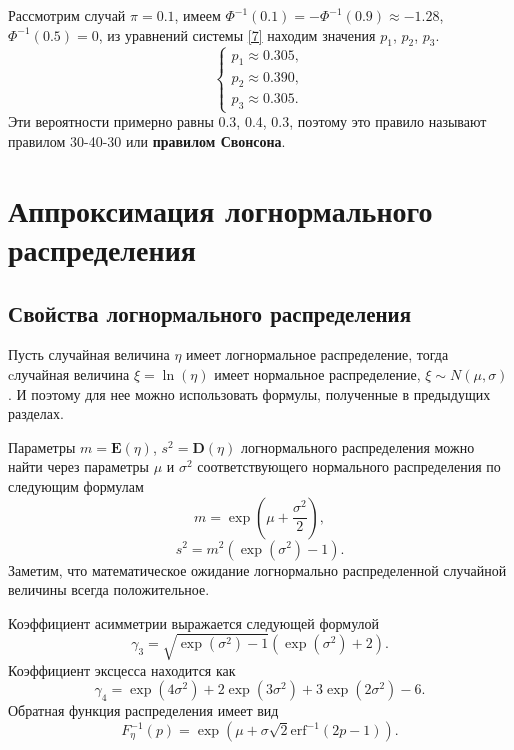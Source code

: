 \documentclass[12pt]{article}
\begin{document}
	Рассмотрим случай $\pi = 0.1$, имеем $\Phi ^{-1}(0.1) = -\Phi ^{-1}(0.9) \approx  -1.28$, $\Phi ^{-1}(0.5) = 0$, из уравнений системы \eqref{7} находим значения $p_{1}$, $p_{2}$, $p_{3}$.
	\begin{equation*}
		\begin{cases}
			p_{1}\approx 0.305, \\ 
			p_{2}\approx 0.390,  \\ 
			p_{3}\approx 0.305.
		\end{cases}
	\end{equation*}
	Эти вероятности примерно равны 0.3, 0.4, 0.3, поэтому это правило называют правилом 30-40-30 или \textbf{правилом Свонсона}.
	
	\section{Аппроксимация логнормального распределения}
	\subsection{Свойства логнормального распределения}  
	
	Пусть случайная величина $\eta$ имеет логнормальное распределение, тогда cлучайная величина $\xi = \ln(\eta)$ имеет нормальное распределение, $\xi \sim N(\mu, \sigma)$. И поэтому для нее можно использовать формулы, полученные в предыдущих разделах.
	
	Параметры $m = \mathbf E(\eta)$, $s^{2} = \mathbf D(\eta)$ логнормального распределения можно найти через параметры $\mu$ и $\sigma^{2}$ соответствующего нормального распределения по следующим формулам
	\begin{equation}
		m = \exp\left( \mu+\frac{\sigma ^{2}}{2}\right) , \label{8}
	\end{equation}
	\begin{equation}
		s^{2} = m^{2}(\exp(\sigma^{2})-1). \label{9}
	\end{equation}
Заметим, что математическое ожидание логнормально распределенной случайной величины всегда положительное.

Коэффициент асимметрии выражается \cite{Discretization} следующей формулой
\begin{equation}
	\gamma_{3} = \sqrt{\exp(\sigma^{2})-1}(\exp(\sigma^{2})+2). \label{10}
\end{equation}
Коэффициент эксцесса находится \cite{Discretization} как
\begin{equation}
	\gamma_{4} = \exp(4\sigma^{2})+2\exp(3\sigma^{2})+3\exp(2\sigma^{2})-6. \label{11}
\end{equation}
Обратная функция распределения имеет вид
\begin{equation}
	F_{\eta}^{-1}(p) = \exp(\mu+\sigma\sqrt{2}\mathrm{erf}^{-1}(2p-1)). \label{12}
\end{equation}
\end{document}
